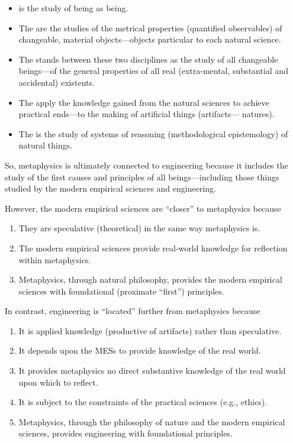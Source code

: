 \begin{itemize}
\item {} is the study of being as being.
\item {} The  are the studies of the metrical properties (quantified observables) of changeable, material objects---objects particular to each natural science.
\item {} The  stands between these two disciplines as the study of all changeable beings---of the general properties of all real (extra-mental, substantial and accidental) existents.
\item The  apply the knowledge gained from the natural sciences to achieve practical ends---to the making of artificial things (artifacts--- natures).
\item {} The  is the study of systems of reasoning (methodological epistemology) of natural things.
\end{itemize}

So, metaphysics is ultimately connected to engineering because it includes the study of the first causes and principles of all beings---including those things studied by the modern empirical sciences and engineering.

However, the modern empirical sciences are ``closer'' to metaphysics because

\begin{enumerate}
\item They are speculative (theoretical) in the same way metaphysics is.
\item The modern empirical sciences provide real-world knowledge for reflection within metaphysics.
\item Metaphysics, through natural philosophy, provides the modern empirical sciences with foundational (proximate ``first'') principles.
\end{enumerate}

In contrast, engineering is ``located'' further from metaphysics because

\begin{enumerate}
\item It is applied knowledge (productive of artifacts) rather than speculative.
\item It depends upon the MESs to provide knowledge of the real world.
\item It provides metaphysics no direct substantive knowledge of the real world upon which to reflect.
\item It is subject to the constraints of the practical sciences (e.g., ethics).
\item Metaphysics, through the philosophy of nature and the modern empirical sciences, provides engineering with foundational principles.
\end{enumerate}

